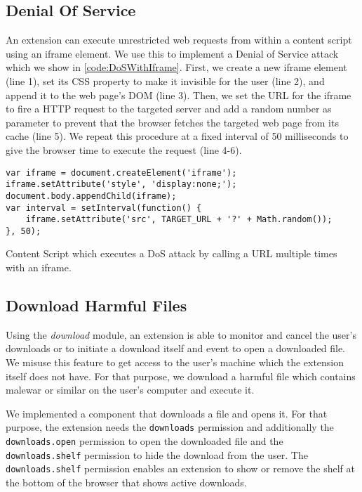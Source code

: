 \subsection{Denial Of Service}

	An extension can execute unrestricted web requests from within a content script using an iframe element. We use this to implement a Denial of Service attack which we show in \autoref{code:DoSWithIframe}. First, we create a new iframe element (line 1), set its CSS property to make it invisible for the user (line 2), and append it to the web page's DOM (line 3). Then, we set the URL for the iframe to fire a HTTP request to the targeted server and add a random number as parameter to prevent that the browser fetches the targeted web page from its cache (line 5). We repeat this procedure at a fixed interval of 50 milliseconds to give the browser time to execute the request (line 4-6).

	\begin{code}
		\begin{lstlisting}
var iframe = document.createElement('iframe');
iframe.setAttribute('style', 'display:none;');
document.body.appendChild(iframe);
var interval = setInterval(function() {	
	iframe.setAttribute('src', TARGET_URL + '?' + Math.random());
}, 50);
\end{lstlisting}
		\caption{Content Script which executes a DoS attack by calling a URL multiple times with an iframe.}
		\label{code:DoSWithIframe}
	\end{code}





\subsection{Download Harmful Files}

	Using the \textit{download} module, an extension is able to monitor and cancel the user's downloads or to initiate a download itself and event to open a downloaded file. We misuse this feature to get access to the user's machine which the extension itself does not have. For that purpose, we download a harmful file which contains malewar or similar on the user's computer and execute it. 
	
	We implemented a component that downloads a file and opens it. For that purpose, the extension needs the \texttt{downloads} permission and additionally the \texttt{downloads.open} permission to open the downloaded file and the \texttt{downloads.shelf} permission to hide the download from the user. The \texttt{downloads.shelf} permission enables an extension to show or remove the shelf at the bottom of the browser that shows active downloads. 
	
